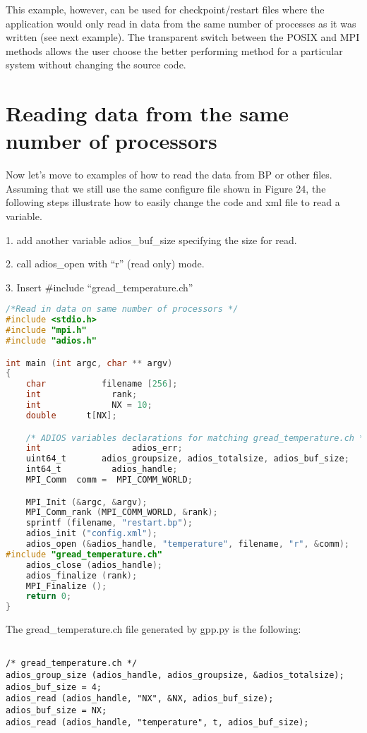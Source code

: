 This example, however, can be used for checkpoint/restart files where the application 
would only read in data from the same number of processes as it was written (see 
next example). The transparent switch between the POSIX and MPI methods allows 
the user choose the better performing method for a particular system without changing 
the source code. 

\section{Reading data from the same number of processors}

Now let's move to examples of how to read the data from BP or other files.  Assuming 
that we still use the same configure file shown in Figure 24, the following steps 
illustrate how to easily change the code and xml file to read a variable. 

1. add another variable adios\_buf\_size specifying the size for read.

2. call adios\_open with ``r'' (read only) mode.

3. Insert \#include ``gread\_temperature.ch''

\begin{lstlisting}[language=C,caption=Example of a generated gread\_temperature.ch 
file examples/C/manual/3\_adios\_read.c]
/*Read in data on same number of processors */
#include <stdio.h>
#include "mpi.h"
#include "adios.h"

int main (int argc, char ** argv) 
{
    char           filename [256];
    int              rank;
    int              NX = 10;
    double      t[NX];

    /* ADIOS variables declarations for matching gread_temperature.ch */
    int                  adios_err;
    uint64_t       adios_groupsize, adios_totalsize, adios_buf_size;
    int64_t          adios_handle;
    MPI_Comm  comm =  MPI_COMM_WORLD;

    MPI_Init (&argc, &argv);
    MPI_Comm_rank (MPI_COMM_WORLD, &rank);
    sprintf (filename, "restart.bp");
    adios_init ("config.xml");
    adios_open (&adios_handle, "temperature", filename, "r", &comm);
#include "gread_temperature.ch"
    adios_close (adios_handle);
    adios_finalize (rank);
    MPI_Finalize ();
    return 0;
}
\end{lstlisting}

The gread\_temperature.ch file generated by gpp.py is the following:

\begin{lstlisting}[caption=Example of a generated gread\_temperature.ch 
file]

/* gread_temperature.ch */
adios_group_size (adios_handle, adios_groupsize, &adios_totalsize);
adios_buf_size = 4;
adios_read (adios_handle, "NX", &NX, adios_buf_size);
adios_buf_size = NX;
adios_read (adios_handle, "temperature", t, adios_buf_size);
\end{lstlisting}


